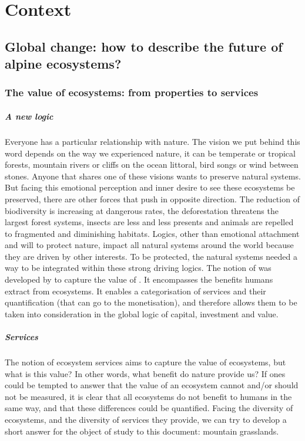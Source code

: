 

\chapter{Context}

\section{Global change: how to describe the future of alpine ecosystems?}

\subsection{The value of ecosystems: from properties to services}

\paragraph{A new logic}
Everyone has a particular relationship with nature. The vision we put behind this word depends on the way we experienced nature, it can be temperate or tropical forests, mountain rivers or cliffs on the ocean littoral, bird songs or wind between stones. Anyone that shares one of these visions wants to preserve natural systems. But facing this emotional perception and inner desire to see these ecosystems be preserved, there are other forces that push in opposite direction. The reduction of biodiversity is increasing at dangerous rates, the deforestation threatens the largest forest systems, insects are less and less presents and animals are repelled to fragmented and diminishing habitats. Logics, other than emotional attachment and will to protect nature, impact all natural systems around the world because they are driven by other interests. To be protected, the natural systems needed a way to be integrated within these strong driving logics. The notion of  was developed by \cite{costanza_value_1997} to capture the value of . It encompasses the benefits humans extract from ecosystems. It enables a categorisation of services and their quantification (that can go to the monetisation), and therefore allows them to be taken into consideration in the global logic of capital, investment and value.


\paragraph{Services}
The notion of ecosystem services aims to capture the value of ecosystems, but what is this value? In other words, what benefit do nature provide us? If ones could be tempted to answer that the value of an ecosystem cannot and/or should not be measured, it is clear that all ecosystems do not benefit to humans in the same way, and that these differences could be quantified. Facing the diversity of ecosystems, and the diversity of services they provide, we can try to develop a short answer for the object of study to this document: mountain grasslands.

